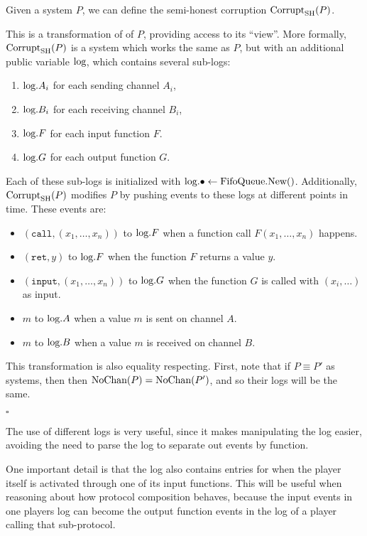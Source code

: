 \begin{definition}
Given a system $P$, we can define
the semi-honest corruption $\text{Corrupt}_{\text{SH}}(P)$.

This is a transformation of
of $P$, providing access to its ``view''.
More formally, $\text{Corrupt}_{\text{SH}}(P)$ is a system which works the same
as $P$, but with an additional public variable $\text{log}$,
which contains several sub-logs:
\begin{enumerate}
  \item $\text{log}.{A_i}$ for each sending channel $A_i$,
  \item $\text{log}.{B_i}$ for each receiving channel $B_i$,
  \item $\text{log}.F$ for each input function $F$.
  \item $\text{log}.G$ for each output function $G$.
\end{enumerate}
Each of these sub-logs is initialized with ${\text{log}.\bullet \gets \text{FifoQueue.New()}}$.
Additionally, $\text{Corrupt}_{\text{SH}}(P)$ modifies $P$ by pushing events to these
logs at different points in time.
These events are:
\begin{itemize}
\item $(\texttt{call}, (x_1, \ldots, x_n))$ to $\text{log}.F$ when a function call $F(x_1, \ldots, x_n)$ happens.
\item $(\texttt{ret}, y)$ to $\text{log}.F$ when the function $F$ returns a value $y$.
\item $(\texttt{input}, (x_1, \ldots, x_n))$ to $\text{log}.G$ when the function $G$ is called with $(x_i, \ldots)$ as input.
\item $m$ to $\text{log}.A$ when a value $m$ is sent on channel $A$.
\item $m$ to $\text{log}.B$ when a value $m$ is received on channel $B$.
\end{itemize}

This transformation is also equality respecting.
First, note that if $P \equiv P'$ as systems, then
then $\text{NoChan}(P) = \text{NoChan}(P')$, and so their logs will be the same.

$\square$
\end{definition}
The use of different logs is very useful, since it makes manipulating
the log easier, avoiding the need to parse the log to separate
out events by function.

One important detail is that the log also contains entries
for when the player itself is activated through one of its input functions.
This will be useful when reasoning about how protocol composition behaves,
because the input events in one players log can become the output function
events in the log of a player calling that sub-protocol.

